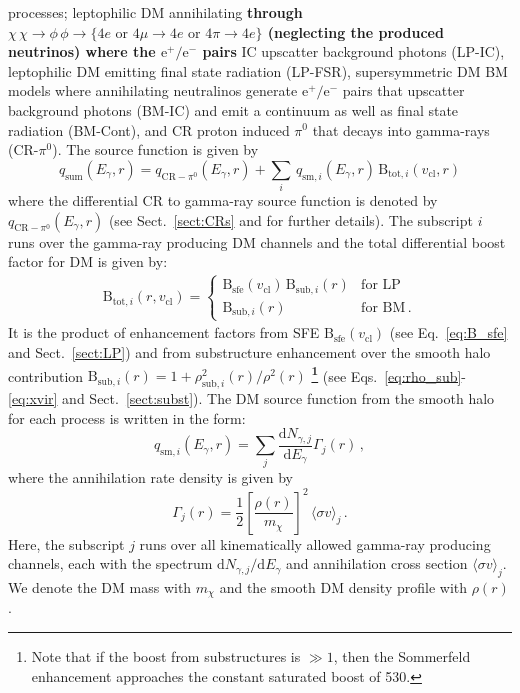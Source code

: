 \documentclass[10pt,aps,pra,reprint,amsmath,amsfonts,amssymb,showpacs,nofootinbib,floatfix]{revtex4-1}
\def\C#1{{\bf #1}}
\newcommand{\rmn}{\mathrm}
\newcommand{\sfe}{\rmn{sfe}}
\newcommand{\sub}{\rmn{sub}}
\newcommand{\B}{\rmn{B}}
\newcommand{\qCR}{q_{\rmn{CR}-\ensuremath{\pi^0}}}
\newcommand{\dd}{\rmn{d}}
\newcommand{\mx}{\ensuremath{m_{\chi}}}
\newcommand{\ngammaj}{\ensuremath{N_{\gamma,j}}}
\newcommand{\sigmaannv}{\ensuremath{\langle\sigma v\rangle}}
\newcommand{\sigv}{v_\rmn{cl}}
\newcommand{\egamma}{\ensuremath{E_{\gamma}}}
\newcommand{\eg}{E_\gamma}
\begin{document}
processes; leptophilic DM annihilating \C{through
  $\chi\,\chi\to\phi\,\phi\to\{4e\mbox{~or~}4\mu\to4e
  \mbox{~or~}4\pi\to4e\}$ (neglecting the produced neutrinos) where
  the $\rmn{e}^+/\rmn{e}^-$ pairs} IC upscatter background photons
(LP-IC), leptophilic DM emitting final state radiation (LP-FSR),
supersymmetric DM BM models where annihilating neutralinos generate
$\rmn{e}^+/\rmn{e}^-$ pairs that upscatter background photons (BM-IC)
and emit a continuum as well as final state radiation (BM-Cont), and
CR proton induced $\pi^0$ that decays into gamma-rays
(CR-$\pi^0$). The source function is given by
\begin{equation}
q_\rmn{sum} (\eg,r) = \qCR(\eg,r)+
\sum_i \,q_{\rmn{sm},i}(\eg,r)\,\B_{\rmn{tot},i}(\sigv,r)
\end{equation}
where the differential CR to gamma-ray source function is denoted
by $\qCR(\eg,r)$ (see Sect.~\ref{sect:CRs} and
\cite{2010MNRAS.409..449P} for further details). The subscript $i$
runs over the gamma-ray producing DM channels and the total
differential boost factor for DM is given by:
\begin{eqnarray}
\B_{\rmn{tot},i}(r,\sigv) = \left\{\begin{array}{cc}
\B_\sfe(\sigv)\,\B_{\sub,i}(r) &\rmn{for\,\,LP}\\
\B_{\sub,i}(r) &\rmn{for\,\,BM\,.}\end{array}\right.
\end{eqnarray}
It is the product of enhancement factors from SFE $\B_\sfe(\sigv)$
(see Eq.~\ref{eq:B_sfe} and Sect.~\ref{sect:LP}) and from substructure
enhancement over the smooth halo contribution $\B_{\sub,i}(r) =
1+\rho_{\sub,i}^2(r)/\rho^2(r)$ \C{\footnote{Note that if the boost
    from substructures is $\gg 1$, then the Sommerfeld enhancement
    approaches the constant saturated boost of 530.}} (see
Eqs.~\ref{eq:rho_sub}-\ref{eq:xvir} and Sect.~\ref{sect:subst}).  The
DM source function from the smooth halo for each process is written in
the form:
\begin{equation}
\label{eq:q_sm}
q_{\rmn{sm},i} (\egamma,r) = \sum_j
\frac{\dd \ngammaj}{\dd E_\gamma} \Gamma_j(r)\,,
\end{equation}
where the annihilation rate density is given by 
\begin{equation}
\label{eq:ann_rate}
\Gamma_j(r) = \frac{1}{2} \left[\frac{\rho(r)}{\mx}\right]^2 
\, \sigmaannv_j\,.
\end{equation}
Here, the subscript $j$ runs over all kinematically allowed gamma-ray
producing channels, each with the spectrum $\dd
  \ngammaj /\dd\eg$ and annihilation cross section $\sigmaannv_j$.
We denote the DM mass with $\mx$ and the smooth DM density profile
with $\rho(r)$.
\end{document}
